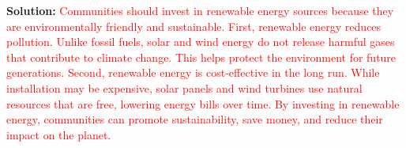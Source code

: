 \documentclass[12pt]{article}
\begin{document}
\begin{tcolorbox}[colframe=black!50, colback=white, title=Question 10: Writing Performance Task]
\textbf{Solution:} \textcolor{red}{Communities should invest in renewable energy sources because they are environmentally friendly and sustainable. First, renewable energy reduces pollution. Unlike fossil fuels, solar and wind energy do not release harmful gases that contribute to climate change. This helps protect the environment for future generations. Second, renewable energy is cost-effective in the long run. While installation may be expensive, solar panels and wind turbines use natural resources that are free, lowering energy bills over time. By investing in renewable energy, communities can promote sustainability, save money, and reduce their impact on the planet.}
\end{tcolorbox}
\end{document}

